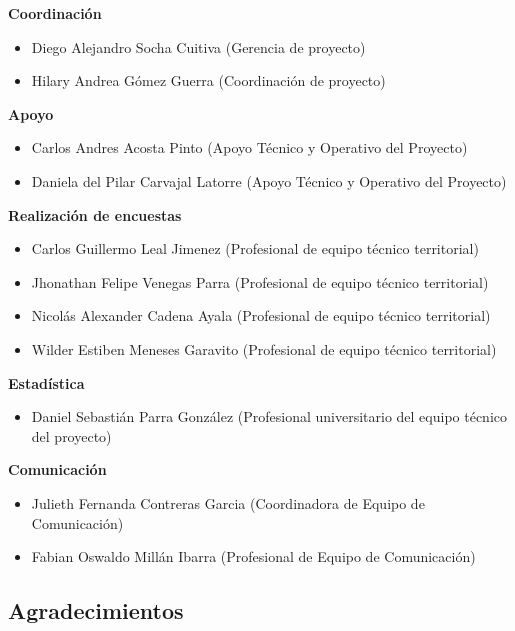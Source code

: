\documentclass[
  oneside]{book}
\begin{document}
\textbf{Coordinación}

\begin{itemize}\item  Diego Alejandro Socha Cuitiva (Gerencia de proyecto)\item  Hilary Andrea Gómez Guerra (Coordinación de proyecto)\end{itemize}

\textbf{Apoyo}

\begin{itemize}\item  Carlos Andres Acosta Pinto (Apoyo Técnico y Operativo del Proyecto)\item  Daniela del Pilar Carvajal Latorre (Apoyo Técnico y Operativo del Proyecto)\end{itemize}

\textbf{Realización de encuestas}

\begin{itemize}\item  Carlos Guillermo Leal Jimenez (Profesional de equipo técnico territorial)\item  Jhonathan Felipe Venegas Parra (Profesional de equipo técnico territorial)\item  Nicolás Alexander Cadena Ayala (Profesional de equipo técnico territorial)\item  Wilder Estiben Meneses Garavito (Profesional de equipo técnico territorial)\end{itemize}

\textbf{Estadística}

\begin{itemize}\item  Daniel Sebastián Parra González (Profesional universitario del equipo técnico del proyecto)\end{itemize}

\textbf{Comunicación}

\begin{itemize}\item  Julieth Fernanda Contreras Garcia (Coordinadora de Equipo de Comunicación)\item  Fabian Oswaldo Millán Ibarra (Profesional de Equipo de Comunicación)\end{itemize}

\hypertarget{agradecimientos}{%
\subsection*{Agradecimientos}\label{agradecimientos}}
\end{document}
